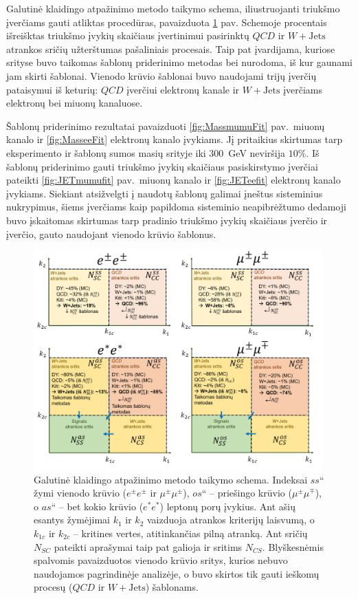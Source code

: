 \documentclass[a4paper, 12pt, oneside]{article}
\newcommand{\WJets}{W\! +\!\mathrm{Jets}}
\newcommand{\ltq}[1]{{\quotedblbase{}#1\textquotedblleft{}}}
\newcommand{\QCD}{QC\! D}
\newlength\q
\begin{document}
Galutinė klaidingo atpažinimo metodo taikymo schema, iliustruojanti triukšmo įverčiams gauti atliktas procedūras, pavaizduota
\ref{fig:FRfinal} pav.
Schemoje procentais išreišktas triukšmo įvykių skaičiaus įvertinimui pasirinktų $\QCD$ ir $\WJets$ atrankos sričių užterštumas
pašaliniais procesais.
Taip pat įvardijama, kuriose srityse buvo taikomas šablonų priderinimo metodas bei nurodoma, iš kur gaunami jam skirti šablonai.
Vienodo krūvio šablonai buvo naudojami trijų įverčių pataisymui iš keturių: $\QCD$ įverčiui elektronų kanale ir $\WJets$ įverčiams
elektronų bei miuonų kanaluose.

Šablonų priderinimo rezultatai pavaizduoti \ref{fig:MassmumuFit} pav.\ miuonų kanalo ir \ref{fig:MasseeFit} elektronų kanalo įvykiams.
Jį pritaikius skirtumas tarp eksperimento ir šablonų sumos masių srityje iki $300$~GeV neviršija $10\%$.
Iš šablonų priderinimo gauti triukšmo įvykių skaičiaus pasiskirstymo įverčiai pateikti \ref{fig:JETmumufit} pav.\ miuonų kanalo
ir \ref{fig:JETeefit} elektronų kanalo įvykiams.
Siekiant atsižvelgti į naudotų šablonų galimai įneštus sisteminius nukrypimus, šiems įverčiams kaip papildoma sisteminio neapibrėžtumo
dedamoji buvo įskaitomas skirtumas tarp pradinio triukšmo įvykių skaičiaus įverčio ir įverčio, gauto naudojant vienodo krūvio
šablonus.

\begin{figure}[t!]
	\RawFloats\centering
	\includegraphics[width=0.99\textwidth]{Magistrinis/FRtaikymas_ssos.png}
	\caption{\label{fig:FRfinal}
		Galutinė klaidingo atpažinimo metodo taikymo schema.
		Indeksai \ltq{$ss$} žymi vienodo krūvio ($e^\pm e^\pm$ ir $\mu^\pm \mu^\pm$), \ltq{$os$} -- priešingo krūvio ($\mu^\pm\mu^\mp$),
		o \ltq{$as$} -- bet kokio krūvio ($e^*e^*$) leptonų porų įvykius.
		Ant ašių esantys žymėjimai $k_1$ ir $k_2$ vaizduoja atrankos kriterijų laisvumą, o $k_{1c}$ ir $k_{2c}$ -- kritines vertes, atitinkančias
		pilną atranką.
		Ant sričių $N_{SC}$ pateikti aprašymai taip pat galioja ir sritims $N_{CS}$.
		Blyškesnėmis spalvomis pavaizduotos vienodo krūvio sritys, kurios nebuvo naudojamos pagrindinėje analizėje, o buvo skirtos tik
		gauti ieškomų procesų ($\QCD$ ir $\WJets$) šablonams.}
\end{figure}
\end{document}
